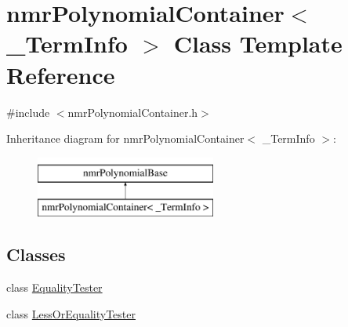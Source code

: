 \hypertarget{classnmr_polynomial_container}{\section{nmr\-Polynomial\-Container$<$ \-\_\-\-Term\-Info $>$ Class Template Reference}
\label{classnmr_polynomial_container}
}


{\ttfamily \#include $<$nmr\-Polynomial\-Container.\-h$>$}

Inheritance diagram for nmr\-Polynomial\-Container$<$ \-\_\-\-Term\-Info $>$\-:\begin{figure}[H]
\begin{center}
\leavevmode
\includegraphics[height=2.000000cm]{d5/dca/classnmr_polynomial_container}
\end{center}
\end{figure}
\subsection*{Classes}
\begin{DoxyCompactItemize}
\item 
class \hyperlink{classnmr_polynomial_container_1_1_equality_tester}{Equality\-Tester}
\item 
class \hyperlink{classnmr_polynomial_container_1_1_less_or_equality_tester}{Less\-Or\-Equality\-Tester}
\end{DoxyCompactItemize}
